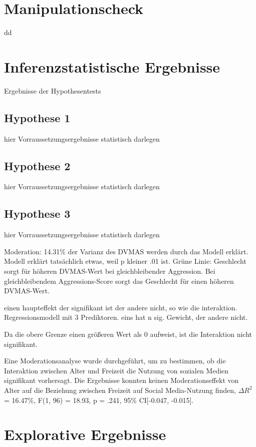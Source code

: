 \section{Manipulationscheck}    \label{sec_4.2}
dd


\section{Inferenzstatistische Ergebnisse}    \label{sec_4.3}
Ergebnisse der Hypothesentests


\subsection{Hypothese 1}    \label{subsec_4.3.1}
hier Vorraussetzungsergebnisse statistisch darlegen


\subsection{Hypothese 2}    \label{subsec_4.3.2}
hier Vorraussetzungsergebnisse statistisch darlegen


\subsection{Hypothese 3}    \label{subsec_4.3.3}
hier Vorraussetzungsergebnisse statistisch darlegen

Moderation: 14.31\% der Varianz des DVMAS werden durch das Modell erklärt.
Modell erklärt tatsächlich etwas, weil p kleiner .01 ist.
Grüne Linie: Geschlecht sorgt für höheren DVMAS-Wert bei gleichbleibender Aggression. Bei gleichbleibendem Aggressions-Score sorgt das Geschlecht für einen höheren DVMAS-Wert.

einen haupteffekt der signifikant ist der andere nicht, so wie die interaktion. Regressionsmodell mit 3 Prediktoren. eins hat n sig. Gewicht, der andere nicht.

Da die obere Grenze einen größeren Wert als 0 aufweist, ist die Interaktion nicht signifikant.

Eine Moderationsanalyse wurde durchgeführt, um zu bestimmen, ob die Interaktion zwischen Alter und Freizeit die Nutzung von sozialen Medien signifikant vorhersagt. Die Ergebnisse konnten keinen Moderationseffekt von Alter auf die Beziehung zwischen Freizeit auf Social Media-Nutzung finden, $\Delta R^{2}$ = 16.47\%, F(1, 96) = 18.93, p = .241, 95\% CI[-0.047, -0.015].


\section{Explorative Ergebnisse}    \label{sec_4.4}

